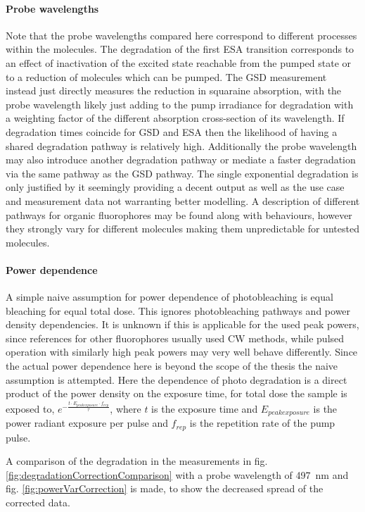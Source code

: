 \documentclass[twoside,openright]{scrreprt}
\begin{document}
\paragraph{Probe wavelengths}
Note that the probe wavelengths compared here correspond to different processes within the molecules. The degradation of the first ESA transition corresponds to an effect of inactivation of the excited state reachable from the pumped state or to a reduction of molecules which can be pumped. The GSD measurement instead just directly measures the reduction in squaraine absorption, with the probe wavelength likely just adding to the pump irradiance for degradation with a weighting factor of the different absorption cross-section of its wavelength. If degradation times coincide for GSD and ESA then the likelihood of having a shared degradation pathway is relatively high. Additionally the probe wavelength may also introduce another degradation pathway or mediate a faster degradation via the same pathway as the GSD pathway. The single exponential degradation is only justified by it seemingly providing a decent output as well as the use case and measurement data not warranting better modelling. A description of different pathways for organic fluorophores may be found along with behaviours, however they strongly vary for different molecules making them unpredictable for untested molecules.\cite{Demchenko_2020}

\paragraph{Power dependence}
A simple naive assumption for power dependence of photobleaching is equal bleaching for equal total dose. This ignores photobleaching pathways and power density dependencies. It is unknown if this is applicable for the used peak powers, since references for other fluorophores usually used CW methods, while pulsed operation with similarly high peak powers may very well behave differently. Since the actual power dependence here is beyond the scope of the thesis the naive assumption is attempted. Here the dependence of photo degradation is a direct product of the power density on the exposure time, for total dose the sample is exposed to, $e^{-\frac{t\cdot E_{peak exposure}\cdot f_{rep}}{\tau}}$, where $t$ is the exposure time and $E_{peak exposure}$ is the power radiant exposure per pulse and $f_{rep}$ is the repetition rate of the pump pulse.\cite{Eggeling1998}

A comparison of the degradation in the measurements in fig. \ref{fig:degradationCorrectionComparison} with a probe wavelength of \SI{497}{\nano\meter} and fig. \ref{fig:powerVarCorrection} is made, to show the decreased spread of the corrected data.
\end{document}

